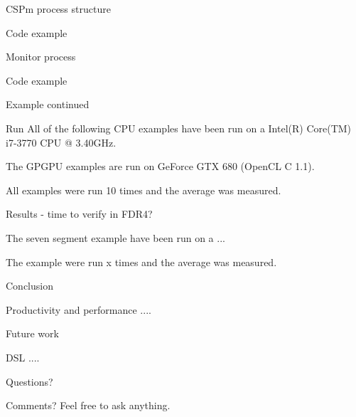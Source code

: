 \documentclass[13pt]{beamer}
\begin{document}
%
\begin{frame}{CSPm process structure}
 \begin{block}{}
   Code example
 \end{block}

\end{frame}
%
\begin{frame}{Monitor process}
 \begin{block}{}
   Code example
 \end{block}

\end{frame}
%
\begin{frame}{Example continued}
 \begin{block}{Run}
   All of the following CPU examples have been run on a Intel(R) Core(TM) i7-3770 CPU @ 3.40GHz.
   \vspace{5mm}

   The GPGPU examples are run on GeForce GTX 680 (OpenCL C 1.1).
   \vspace{5mm}

   All examples were run 10 times and the average was measured.
 \end{block}
\end{frame}
%
\begin{frame}{Results - time to verify in FDR4?}
 \begin{block}{}
   The seven segment example have been run on a ...
   \vspace{5mm}

   The example were run x times and the average was measured.
 \end{block}
\end{frame}
%
\begin{frame}{Conclusion}
 \begin{block}{Productivity and performance}
  ....
 \end{block}
\end{frame}
%
\begin{frame}{Future work}
 \begin{block}{DSL}
     ....
 \end{block}
\end{frame}
%
\begin{frame}{Questions?}
	\begin{block}{Comments?}
		Feel free to ask anything.
	\end{block}
\end{frame}
\end{document}
